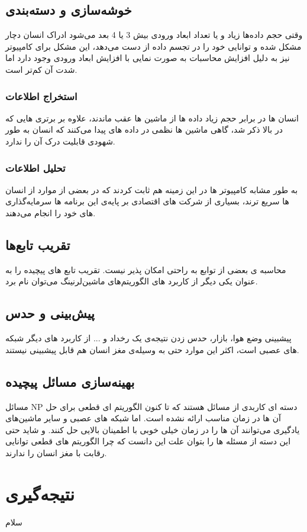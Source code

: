 \documentclass[11pt,a4paper,twocolumn]{article}
\begin{document}
\subsection{خوشه‌سازی و دسته‌بندی}
وقتی حجم داده‌ها زیاد و یا تعداد ابعاد ورودی بیش 3 یا 4 بعد می‌شود ادراک انسان دچار مشکل شده و توانایی خود را در تجسم داده از دست می‌دهد، این مشکل برای کامپیوتر نیز به دلیل افزایش محاسبات به صورت نمایی با افزایش ابعاد ورودی وجود دارد اما شدت آن کم‌تر است.
\subsubsection{استخراج اطلاعات}
انسان ها در برابر حجم زیاد داده ها از ماشین ها عقب ماندند، علاوه بر برتری هایی که در بالا ذکر شد، گاهی ماشین ها نظمی در داده های پیدا می‌کنند که انسان به طور شهودی قابلیت درک آن را ندارد.
\subsubsection{تحلیل اطلاعات}
به طور مشابه کامپیوتر ها در این زمینه هم ثابت کردند که در بعضی از موارد از انسان ها سریع ترند، بسیاری از شرکت های اقتصادی بر پایه‌ی این برنامه ها سرمایه‌گذاری های خود را انجام می‌دهند.
\subsection{تقریب تابع‌ها}
محاسبه ی بعضی از توابع به راحتی امکان پذیر نیست. تقریب تابع های پیچیده را به عنوان یکی دیگر از کاربرد های الگوریتم‌های ماشین‌لرنینگ می‌توان نام برد.
\subsection{پیش‌بینی و حدس}
پیشبینی وضع هوا، بازار، حدس زدن نتیجه‌ی یک رخداد و ... از کاربرد های دیگر شبکه های عصبی است، اکثر این موارد حتی به وسیله‌ی مغز انسان هم قابل پیشبینی نیستند.
\subsection{بهینه‌سازی مسائل پیچیده}
مسائل NP دسته ای کاربدی از مسائل هستند که تا کنون الگوریتم ای قطعی برای حل آن ها در زمان مناسب ارائه نشده است. اما شبکه های عصبی و سایر ماشین‌های یادگیری می‌توانند آن ها را در زمان خیلی خوبی با اطمینان بالایی حل کنند. و شاید حتی این دسته از مسئله ها را بتوان علت این دانست که چرا الگوریتم های قطعی توانایی رقابت با مغز انسان را ندارند. 
\section{نتیجه‌گیری}
سلام
\end{document}

